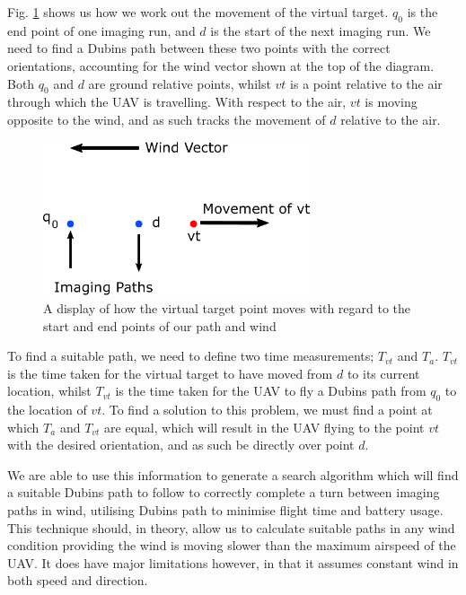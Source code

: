 Fig. \ref{fig:windalgorithm} shows us how we work out the movement of the virtual target. $q_0$ is the end point of one imaging run, and $d$ is the start of the next imaging run. We need to find a Dubins path between these two points with the correct orientations, accounting for the wind vector shown at the top of the diagram. Both $q_0$ and $d$ are ground relative points, whilst $vt$ is a point relative to the air through which the UAV is travelling. With respect to the air, $vt$ is moving opposite to the wind, and as such tracks the movement of $d$ relative to the air.
\vspace{1cm}
\begin{figure}[htbp!] 
\centering    
\includegraphics[width=0.7\textwidth]{WindAlgorithm}
\caption[Calculating a Dubins Path in Wind]{A display of how the virtual target point moves with regard to the start and end points of our path and wind}
\label{fig:windalgorithm}
\end{figure}

To find a suitable path, we need to define two time measurements; $T_{vt}$ and $T_a$. $T_{vt}$ is the time taken for the virtual target to have moved from $d$ to its current location, whilst $T_{vt}$ is the time taken for the UAV to fly a Dubins path from $q_0$ to the location of $vt$. To find a solution to this problem, we must find a point at which $T_a$ and $T_{vt}$ are equal, which will result in the UAV flying to the point $vt$ with the desired orientation, and as such be directly over point $d$. 


We are able to use this information to generate a search algorithm which will find a suitable Dubins path to follow to correctly complete a turn between imaging paths in wind, utilising Dubins path to minimise flight time and battery usage. This technique should, in theory, allow us to calculate suitable paths in any wind condition providing the wind is moving slower than the maximum airspeed of the UAV. It does have major limitations however, in that it assumes constant wind in both speed and direction. %

